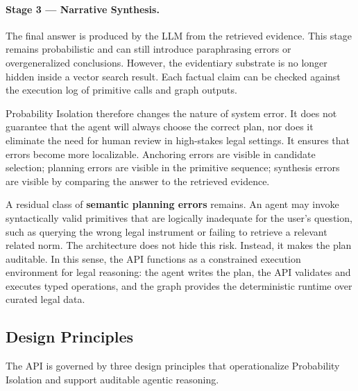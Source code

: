 \documentclass[11pt]{article}
\begin{document}
\paragraph{Stage 3 --- Narrative Synthesis.}
The final answer is produced by the LLM from the retrieved evidence. This stage remains probabilistic and can still introduce paraphrasing errors or overgeneralized conclusions. However, the evidentiary substrate is no longer hidden inside a vector search result. Each factual claim can be checked against the execution log of primitive calls and graph outputs.

Probability Isolation therefore changes the nature of system error. It does not guarantee that the agent will always choose the correct plan, nor does it eliminate the need for human review in high-stakes legal settings. It ensures that errors become more localizable. Anchoring errors are visible in candidate selection; planning errors are visible in the primitive sequence; synthesis errors are visible by comparing the answer to the retrieved evidence.

A residual class of \textbf{semantic planning errors} remains. An agent may invoke syntactically valid primitives that are logically inadequate for the user's question, such as querying the wrong legal instrument or failing to retrieve a relevant related norm. The architecture does not hide this risk. Instead, it makes the plan auditable. In this sense, the API functions as a constrained execution environment for legal reasoning: the agent writes the plan, the API validates and executes typed operations, and the graph provides the deterministic runtime over curated legal data.

\subsection{Design Principles}
\label{subsec:design_principles}

The API is governed by three design principles that operationalize Probability Isolation and support auditable agentic reasoning.
\end{document}
